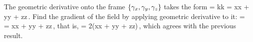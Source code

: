 \begin{verification}
The geometric derivative onto the frame $\left\lbrace{\gamma_{x},\gamma_{y}, \gamma_{z}}\right\rbrace$ takes the form
\beq
\gder = \rfvec k\igder k 
      = \rfvec x\igder x + \rfvec y\igder y + \rfvec z\igder z\,.
\eeq
Find the gradient of the field by applying geometric derivative to it:
\beq
\grad\phi = \gder\phi 
          = \rfvec x\xpd\phi x + \rfvec y\xpd\phi y + \rfvec z\xpd\phi z\,,
\eeq
that is,
\beq
\grad\phi = 2(x\rfvec x + y\rfvec y + z\rfvec z)\,,
\eeq
which agrees with the previous result.
\end{verification}
